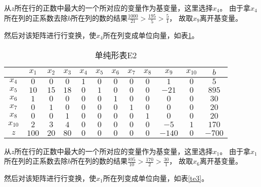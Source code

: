 \begin{solution}
      从$z$所在行的正数中最大的一个所对应的变量作为基变量，这里选择$x_4$。
      由于拿$x_4$所在列的正系数去除$b$所在列的数的结果$\frac{1000}{21}>\frac{195}{5}>\frac{5}{1}$，
      故取$x_{9}$离开基变量。

      然后对该矩阵进行行变换，使$x_4$所在列变成单位向量，如表\ref{te2}。

      \begin{table}[!h]
        \centering
        \caption{单纯形表E2}
        \label{te2}
        \begin{tabular}{c|ccccccccccc} 
        \toprule
                 &$x_1$  &$x_2$  &$x_3$  &$x_4$  &$x_5$  &$x_6$  &$x_7$  &$x_8$  &$x_9$  &$x_{10}$ &$b$    \\\hline
        $x_4$    &$0$    &$0$    &$0$    &$1$    &$0$    &$0$    &$0$    &$0$    &$1$    &$0$      &$5$    \\
        $x_5$    &$10$   &$15$   &$18$   &$0$    &$1$    &$0$    &$0$    &$0$    &$-21$  &$0$      &$895$  \\
        $x_6$    &$1$    &$0$    &$0$    &$0$    &$0$    &$1$    &$0$    &$0$    &$0$    &$0$      &$30$   \\
        $x_7$    &$0$    &$1$    &$0$    &$0$    &$0$    &$0$    &$1$    &$0$    &$0$    &$0$      &$20$   \\
        $x_8$    &$0$    &$0$    &$1$    &$0$    &$0$    &$0$    &$0$    &$1$    &$0$    &$0$      &$20$   \\
        $x_{10}$ &$2$    &$3$    &$4$    &$0$    &$0$    &$0$    &$0$    &$0$    &$-5$   &$1$      &$170$  \\
        $z$      &$100$  &$20$   &$80$   &$0$    &$0$    &$0$    &$0$    &$0$    &$-140$ &$0$      &$-700$ \\
        \bottomrule
        \end{tabular}
     \end{table}

      从$z$所在行的正数中最大的一个所对应的变量作为基变量，这里选择$x_1$。
      由于拿$x_1$所在列的正系数去除$b$所在列的数的结果$\frac{895}{10}>\frac{170}{2}>\frac{30}{1}$，
      故取$x_{6}$离开基变量。

     然后对该矩阵进行行变换，使$x_1$所在列变成单位向量，如表\ref{te3}。


\end{solution}
